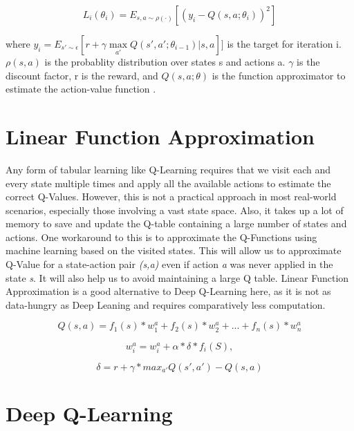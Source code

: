 \documentclass[logo,msc]{infthesis}           %
\begin{document}
\begin{equation} L_{i}(\theta _{i}) = E_{s,a\sim\rho(\cdot)}[(y_{i} - Q(s,a;\theta _{i}))^2]
\label{eq:DQN}
\end{equation}

where \(y_{i} = E_{s'\sim\epsilon}[r+\gamma\max\limits_{{a'}}Q(s', a'; \theta_{i-1})|s, a]]\) is the target for iteration i. \(\rho(s,a)\) is the probablity distribution over states s and actions a. \(\gamma\) is the discount factor, r is the reward, and \(Q(s,a;\theta)\) is the function approximator to estimate the action-value function \cite{DBLP:journals/corr/MnihKSGAWR13}.

\section{Linear Function Approximation}

Any form of tabular learning like Q-Learning requires that we visit each and every state multiple times and apply all the available actions to estimate the correct Q-Values. However, this is not a practical approach in most real-world scenarios, especially those involving a vast state space. Also, it takes up a lot of memory to save and update the Q-table containing a large number of states and actions. One workaround to this is to approximate the Q-Functions using machine learning based on the visited states. This will allow us to approximate Q-Value for a state-action pair \textit{(s,a)} even if action \textit{a} was never applied in the state \textit{s}. It will also help us to avoid maintaining a large Q table. Linear Function Approximation \cite{P2} is a good alternative to Deep Q-Learning here, as it is not as data-hungry as Deep Leaning and requires comparatively less computation.

\begin{equation}
Q(s,a) = f_1(s) * w_1^a + f_2(s) * w_2^a + ... + f_n(s) * w_n^a 
\label{eq:Q_Approx}
\end{equation}

\begin{equation}
w_i^a = w_i^a  + {\alpha} * {\delta} * f_i(S),
\label{eq:W_Approx}
\end{equation}

\begin{equation}
{\delta} = r + {\gamma} * max_{a'} Q(s',a') - Q(s,a)
\label{eq:delta}
\end{equation}

\section{Deep Q-Learning}
\end{document}
